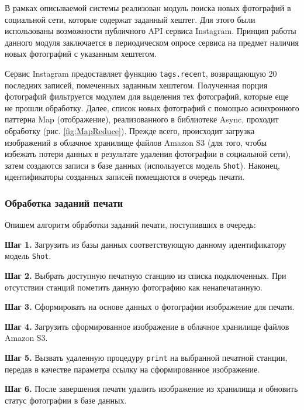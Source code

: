 \documentclass[a4paper,14pt,href,draft]{article}
\begin{document}
В рамках описываемой системы реализован модуль поиска новых фотографий в социальной сети, которые содержат заданный
хештег. Для этого были использованы возможности публичного API сервиса Instagram. Принцип работы данного модуля заключается
в периодическом опросе сервиса на предмет наличия новых фотографий с указанным хештегом.

Сервис Instagram предоставляет функцию \texttt{tags.recent}, возвращающую 20 последних записей, помеченных заданным
хештегом. Полученная порция фотографий фильтруется модулем для выделения тех фотографий, которые еще не прошли обработку.
Далее, список новых фотографий с помощью асинхронного паттерна Map (отображение), реализованного в библиотеке
Async\cite{Async}, проходит обработку (рис. \ref{fig:MapReduce}). Прежде всего, происходит загрузка изображений в
облачное хранилище файлов Amazon S3 (для того, чтобы избежать потери данных в результате удаления фотографии в социальной сети),
затем создаются записи в базе данных (используется модель \texttt{Shot}). Наконец, идентификаторы созданных записей помещаются
в очередь печати.

\subsubsection{Обработка заданий печати}
Опишем алгоритм обработки заданий печати, поступивших в очередь:
\begin{description}
  \item \textbf{Шаг 1.} Загрузить из базы данных соответствующую данному идентификатору модель \texttt{Shot}.
  \item \textbf{Шаг 2.} Выбрать доступную печатную станцию из списка подключенных. При отсутствии станций пометить
    данную фотографию как ненапечатанную.
  \item \textbf{Шаг 3.} Сформировать на основе данных о фотографии изображение для печати.
  \item \textbf{Шаг 4.} Загрузить сформированное изображение в облачное хранилище файлов Amazon S3.
  \item \textbf{Шаг 5.} Вызвать удаленную процедуру \texttt{print} на выбранной печатной станции, передав в качестве
    параметра ссылку на сформированное изображение.
  \item \textbf{Шаг 6.} После завершения печати удалить изображение из хранилища и обновить статус фотографии в базе
    данных.
\end{description}
\end{document}
